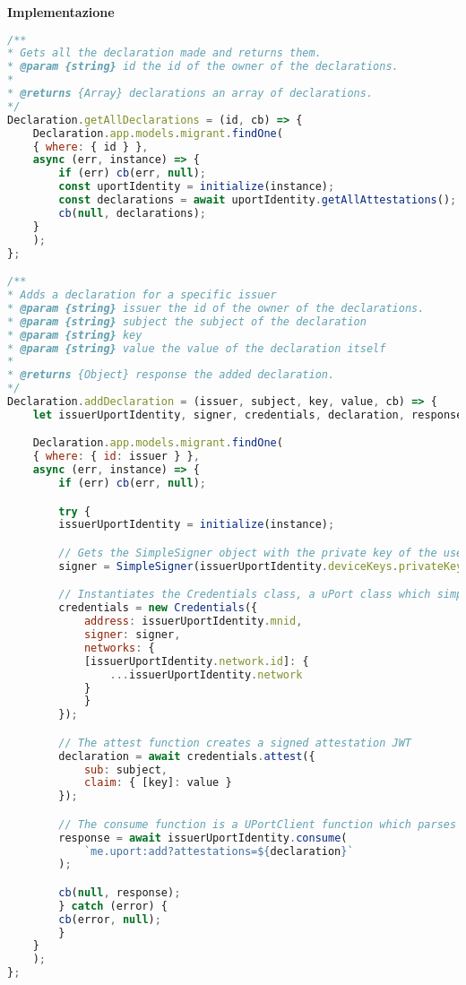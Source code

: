 \textbf{Implementazione}

\begin{lstlisting}[language=JavaScript]
/**
* Gets all the declaration made and returns them.
* @param {string} id the id of the owner of the declarations.
*
* @returns {Array} declarations an array of declarations.
*/
Declaration.getAllDeclarations = (id, cb) => {
    Declaration.app.models.migrant.findOne(
    { where: { id } },
    async (err, instance) => {
        if (err) cb(err, null);
        const uportIdentity = initialize(instance);
        const declarations = await uportIdentity.getAllAttestations();
        cb(null, declarations);
    }
    );
};

/**
* Adds a declaration for a specific issuer
* @param {string} issuer the id of the owner of the declarations.
* @param {string} subject the subject of the declaration
* @param {string} key
* @param {string} value the value of the declaration itself
*
* @returns {Object} response the added declaration.
*/
Declaration.addDeclaration = (issuer, subject, key, value, cb) => {
    let issuerUportIdentity, signer, credentials, declaration, response;

    Declaration.app.models.migrant.findOne(
    { where: { id: issuer } },
    async (err, instance) => {
        if (err) cb(err, null);

        try {
        issuerUportIdentity = initialize(instance);

        // Gets the SimpleSigner object with the private key of the user, which is needed to sign transactions
        signer = SimpleSigner(issuerUportIdentity.deviceKeys.privateKey);

        // Instantiates the Credentials class, a uPort class which simplifies the creation of signed attestation JWTs
        credentials = new Credentials({
            address: issuerUportIdentity.mnid,
            signer: signer,
            networks: {
            [issuerUportIdentity.network.id]: {
                ...issuerUportIdentity.network
            }
            }
        });

        // The attest function creates a signed attestation JWT
        declaration = await credentials.attest({
            sub: subject,
            claim: { [key]: value }
        });

        // The consume function is a UPortClient function which parses uPort uris and relays them to the responsible functions
        response = await issuerUportIdentity.consume(
            `me.uport:add?attestations=${declaration}`
        );

        cb(null, response);
        } catch (error) {
        cb(error, null);
        }
    }
    );
};
\end{lstlisting}

